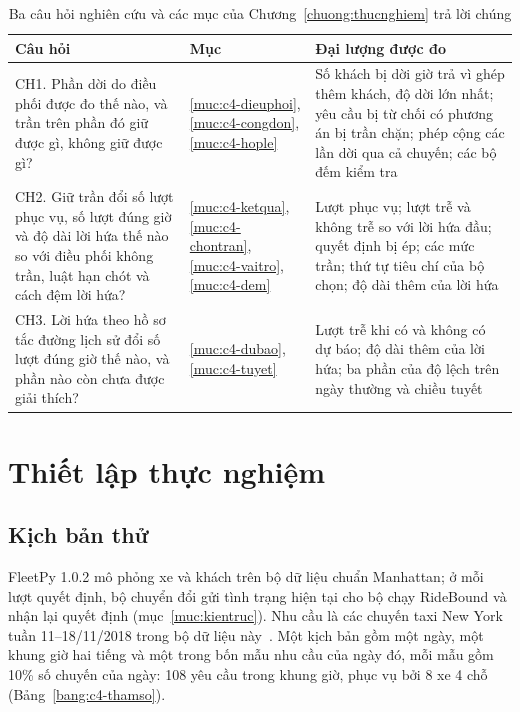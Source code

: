 \begin{table}[htbp]
\centering
\caption{Ba câu hỏi nghiên cứu và các mục của Chương~\ref{chuong:thucnghiem} trả lời chúng}
\label{bang:c4-lotrinh}
\small
\begin{tabular}{@{}p{6.3cm}p{2.4cm}p{6.3cm}@{}}
\toprule
\textbf{Câu hỏi} & \textbf{Mục} & \textbf{Đại lượng được đo}\\
\midrule
CH1. Phần dời do điều phối được đo thế nào, và trần trên phần đó giữ được gì, không giữ được gì?
& \ref{muc:c4-dieuphoi}, \ref{muc:c4-congdon}, \ref{muc:c4-hople}
& Số khách bị dời giờ trả vì ghép thêm khách, độ dời lớn nhất; yêu cầu bị từ chối có phương án bị trần chặn;
phép cộng các lần dời qua cả chuyến; các bộ đếm kiểm tra\\
CH2. Giữ trần đổi số lượt phục vụ, số lượt đúng giờ và độ dài lời hứa thế nào so với điều phối không
trần, luật hạn chót và cách đệm lời hứa?
& \ref{muc:c4-ketqua}, \ref{muc:c4-chontran}, \ref{muc:c4-vaitro}, \ref{muc:c4-dem}
& Lượt phục vụ; lượt trễ và không trễ so với lời hứa đầu; quyết định bị ép; các mức trần; thứ tự tiêu chí
của bộ chọn; độ dài thêm của lời hứa\\
CH3. Lời hứa theo hồ sơ tắc đường lịch sử đổi số lượt đúng giờ thế nào, và phần nào còn chưa được
giải thích?
& \ref{muc:c4-dubao}, \ref{muc:c4-tuyet}
& Lượt trễ khi có và không có dự báo; độ dài thêm của lời hứa; ba phần của độ lệch trên ngày thường và chiều
tuyết\\
\bottomrule
\end{tabular}
\end{table}

\section{Thiết lập thực nghiệm}
\label{muc:c4-thietlap}

\subsection{Kịch bản thử}
\label{muc:c4-kichban}

FleetPy 1.0.2 mô phỏng xe và khách trên bộ dữ liệu chuẩn Manhattan; ở mỗi lượt quyết định, bộ chuyển đổi gửi tình
trạng hiện tại cho bộ chạy RideBound và nhận lại quyết định (mục~\ref{muc:kientruc}). Nhu cầu là các chuyến taxi New
York tuần 11--18/11/2018 trong bộ dữ liệu này~\cite{engelhardt2026}. Một kịch bản gồm một ngày, một khung giờ hai
tiếng và một trong bốn mẫu nhu cầu của ngày đó, mỗi mẫu gồm 10\% số chuyến của ngày: 108 yêu cầu trong khung giờ, phục
vụ bởi 8 xe 4 chỗ (Bảng~\ref{bang:c4-thamso}).

